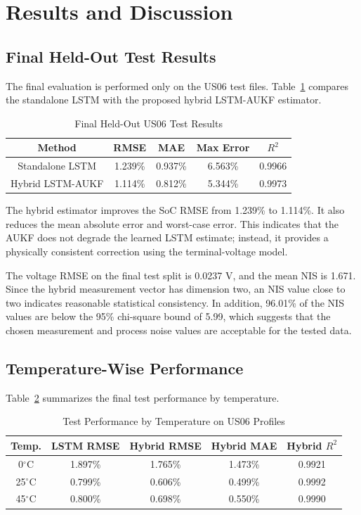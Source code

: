 \documentclass[lettersize,journal]{IEEEtran}
\begin{document}
\section{Results and Discussion}
\subsection{Final Held-Out Test Results}
The final evaluation is performed only on the US06 test files. Table~\ref{tab:test_results} compares the standalone LSTM with the proposed hybrid LSTM-AUKF estimator.

\begin{table}[!t]
\caption{Final Held-Out US06 Test Results}
\label{tab:test_results}
\centering
\begin{tabular}{|c|c|c|c|c|}
\hline
\textbf{Method} & \textbf{RMSE} & \textbf{MAE} & \textbf{Max Error} & \textbf{$R^2$} \\
\hline
Standalone LSTM & 1.239\% & 0.937\% & 6.563\% & 0.9966 \\
\hline
Hybrid LSTM-AUKF & 1.114\% & 0.812\% & 5.344\% & 0.9973 \\
\hline
\end{tabular}
\end{table}

The hybrid estimator improves the SoC RMSE from 1.239\% to 1.114\%. It also reduces the mean absolute error and worst-case error. This indicates that the AUKF does not degrade the learned LSTM estimate; instead, it provides a physically consistent correction using the terminal-voltage model.

The voltage RMSE on the final test split is 0.0237 V, and the mean NIS is 1.671. Since the hybrid measurement vector has dimension two, an NIS value close to two indicates reasonable statistical consistency. In addition, 96.01\% of the NIS values are below the 95\% chi-square bound of 5.99, which suggests that the chosen measurement and process noise values are acceptable for the tested data.

\subsection{Temperature-Wise Performance}
Table~\ref{tab:temperature_results} summarizes the final test performance by temperature.

\begin{table}[!t]
\caption{Test Performance by Temperature on US06 Profiles}
\label{tab:temperature_results}
\centering
\begin{tabular}{|c|c|c|c|c|}
\hline
\textbf{Temp.} & \textbf{LSTM RMSE} & \textbf{Hybrid RMSE} & \textbf{Hybrid MAE} & \textbf{Hybrid $R^2$} \\
\hline
0$^\circ$C & 1.897\% & 1.765\% & 1.473\% & 0.9921 \\
\hline
25$^\circ$C & 0.799\% & 0.606\% & 0.499\% & 0.9992 \\
\hline
45$^\circ$C & 0.800\% & 0.698\% & 0.550\% & 0.9990 \\
\hline
\end{tabular}
\end{table}
\end{document}
